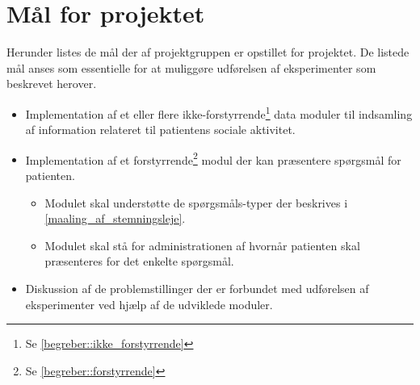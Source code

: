 \section{Mål for projektet}
Herunder listes de mål der af projektgruppen er opstillet for projektet.
De listede mål anses som essentielle for at muliggøre udførelsen af eksperimenter som beskrevet herover.
\begin{itemize}
\item Implementation af et eller flere ikke-forstyrrende\footnote{Se \cref{begreber::ikke_forstyrrende}} data moduler til indsamling af information relateret til patientens sociale aktivitet.
\item Implementation af et forstyrrende\footnote{Se \cref{begreber::forstyrrende}} modul der kan præsentere spørgsmål for patienten.
\begin{itemize}
\item Modulet skal understøtte de spørgsmåls-typer der beskrives i \cref{maaling_af_stemningsleje}.
\item Modulet skal stå for administrationen af hvornår patienten skal præsenteres for det enkelte spørgsmål.
\end{itemize}
\item Diskussion af de problemstillinger der er forbundet med udførelsen af eksperimenter ved hjælp af de udviklede moduler.
\end{itemize}